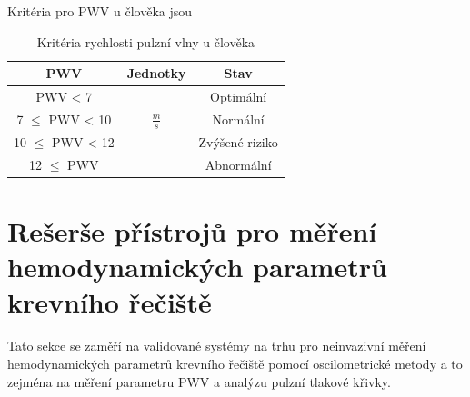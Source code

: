 Kritéria pro PWV u člověka jsou
\begin{table}[H]
    \label{tab:pwv_criteria}
    \caption{Kritéria rychlosti pulzní vlny u člověka \cite{cite:Fabian}}
    \begin{ctucolortab}
        \begin{tabular}{ccc}
            \toprule
            PWV                & Jednotky      & Stav           \\ \midrule
            PWV < 7            &               & Optimální      \\
            7 $\leq$ PWV < 10  & $\frac{m}{s}$ & Normální       \\
            10 $\leq$ PWV < 12 &               & Zvýšené riziko \\
            12  $\leq$ PWV     &               & Abnormální     \\

            \bottomrule
        \end{tabular}
    \end{ctucolortab}
\end{table}
\section{Rešerše přístrojů pro měření hemodynamických parametrů krevního řečiště}
Tato sekce se zaměří na validované systémy na trhu pro neinvazivní měření hemodynamických parametrů krevního řečiště pomocí oscilometrické metody a to zejména na měření parametru PWV a analýzu pulzní tlakové křivky.


